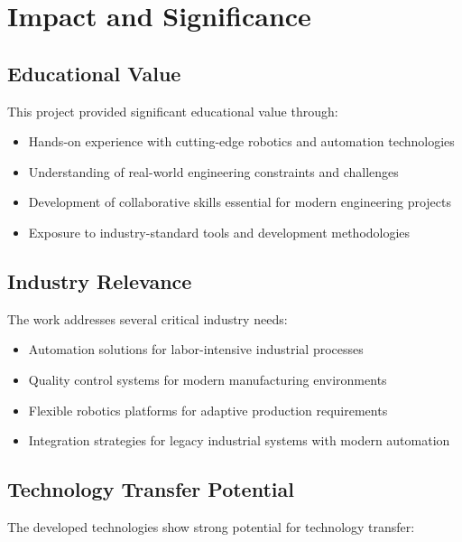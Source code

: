 \documentclass{book}
\begin{document}
\section{Impact and Significance}

\subsection{Educational Value}

\par\noindent This project provided significant educational value through:

\begin{itemize}
\item Hands-on experience with cutting-edge robotics and automation technologies
\item Understanding of real-world engineering constraints and challenges
\item Development of collaborative skills essential for modern engineering projects
\item Exposure to industry-standard tools and development methodologies
\end{itemize}

\subsection{Industry Relevance}

\par\noindent The work addresses several critical industry needs:

\begin{itemize}
\item Automation solutions for labor-intensive industrial processes
\item Quality control systems for modern manufacturing environments
\item Flexible robotics platforms for adaptive production requirements
\item Integration strategies for legacy industrial systems with modern automation
\end{itemize}

\subsection{Technology Transfer Potential}

\par\noindent The developed technologies show strong potential for technology transfer:
\end{document}
